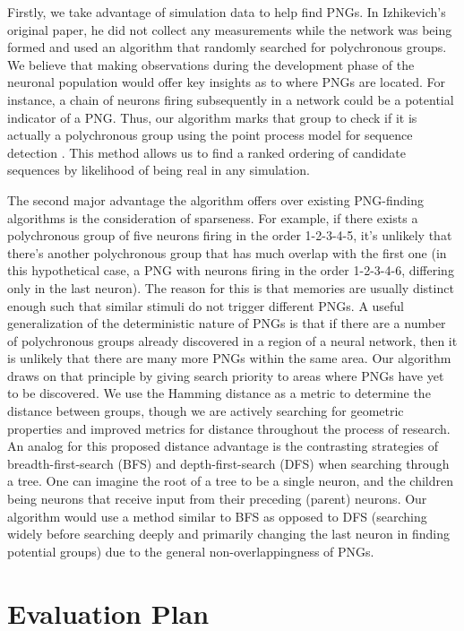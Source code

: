 \documentclass{sigchi}
\begin{document}
Firstly, we take advantage of simulation data to help find PNGs. In Izhikevich's original paper, he did not collect any measurements while the network was being formed and used an algorithm that randomly searched for polychronous groups. We believe that making observations during the development phase of the neuronal population would offer key insights as to where PNGs are located. For instance, a chain of neurons firing subsequently in a network could be a potential indicator of a PNG. Thus, our algorithm marks that group to check if it is actually a polychronous group using the point process model for sequence detection \cite{ppseq}. This method allows us to find a ranked ordering of candidate sequences by likelihood of being real in any simulation.


The second major advantage the algorithm offers over existing PNG-finding algorithms is the consideration of sparseness. For example, if there exists a polychronous group of five neurons firing in the order 1-2-3-4-5, it's unlikely that there's another polychronous group that has much overlap with the first one (in this hypothetical case, a PNG with neurons firing in the order 1-2-3-4-6, differing only in the last neuron). The reason for this is that memories are usually distinct enough such that similar stimuli do not trigger different PNGs. A useful generalization of the deterministic nature of PNGs is that if there are a number of polychronous groups already discovered in a region of a neural network, then it is unlikely that there are many more PNGs within the same area. Our algorithm draws on that principle by giving search priority to areas where PNGs have yet to be discovered. We use the Hamming distance as a metric to determine the distance between groups, though we are actively searching for geometric properties and improved metrics for distance throughout the process of research. An analog for this proposed distance advantage is the contrasting strategies of breadth-first-search (BFS) and depth-first-search (DFS) when searching through a tree. One can imagine the root of a tree to be a single neuron, and the children being neurons that receive input from their preceding (parent) neurons. Our algorithm would use a method similar to BFS as opposed to DFS (searching widely before searching deeply and primarily changing the last neuron in finding potential groups) due to the general non-overlappingness of PNGs.

\section{Evaluation Plan}
\end{document}
